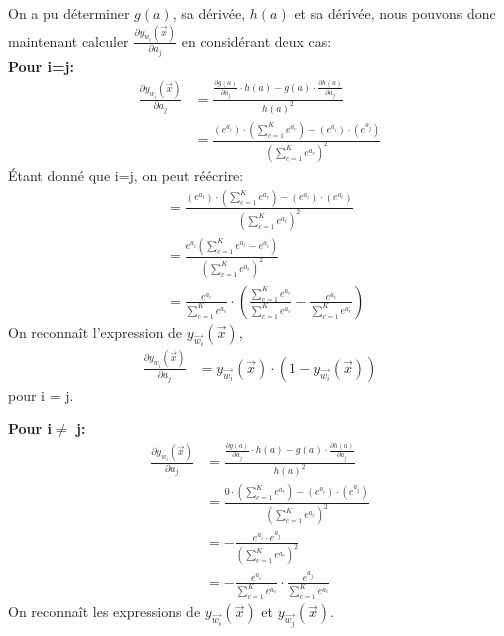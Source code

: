 On a pu déterminer $g(a)$, sa dérivée, $h(a)$ et sa dérivée, nous pouvons donc maintenant calculer $\frac{\partial y_{w_i}(\overrightarrow{x})} {\partial a_j}$ en considérant deux cas:\\
\textbf{Pour i=j:}
\begin{equation}
\begin{split}
	\frac{\partial y_{w_i}(\overrightarrow{x})} {\partial a_j} &= \frac{\frac{\partial g(a)} {\partial a_j} \cdot h(a) - g(a) \cdot \frac{\partial h(a)} {\partial a_j}}{h(a)^2} \\
	&= \frac{(e^{a_i})\cdot(\sum_{c=1}^K e^{a_c}) - (e^{a_i}) \cdot (e^{a_j})}{(\sum_{c=1}^K e^{a_c})^2}
\end{split}
\end{equation}
Étant donné que i=j, on peut réécrire:
\begin{equation}
\begin{split}
&= \frac{(e^{a_i})\cdot(\sum_{c=1}^K e^{a_c}) - (e^{a_i}) \cdot (e^{a_i})}{(\sum_{c=1}^K e^{a_c})^2} \\
&= \frac{e^{a_i}\left( \sum_{c=1}^K e^{a_c} - e^{a_i} \right)}{(\sum_{c=1}^K e^{a_c})^2} \\
&= \frac{e^{a_i}}{\sum_{c=1}^K e^{a_c}} \cdot \left(  \frac{\sum_{c=1}^K e^{a_c}}{\sum_{c=1}^K e^{a_c}} - \frac{e^{a_i}}{\sum_{c=1}^K e^{a_c}}\right)
\end{split}
\end{equation}
On reconnaît l'expression de $ y_{\overrightarrow{w_i}}(\overrightarrow{x}) $, 
\begin{equation}
\begin{split}
\frac{\partial y_{w_i}(\overrightarrow{x})} {\partial a_j} &=  y_{\overrightarrow{w_i}}(\overrightarrow{x}) \cdot \left(1-y_{\overrightarrow{w_i}}(\overrightarrow{x}) \right)
\end{split}
\end{equation}
pour i = j.

\textbf{Pour i$\neq$ j:}
\begin{equation}
\begin{split}
\frac{\partial y_{w_i}(\overrightarrow{x})} {\partial a_j} &= \frac{\frac{\partial g(a)} {\partial a_j} \cdot h(a) - g(a) \cdot \frac{\partial h(a)} {\partial a_j}}{h(a)^2} \\
&= \frac{0 \cdot (\sum_{c=1}^K e^{a_c}) - (e^{a_i}) \cdot (e^{a_j})}{(\sum_{c=1}^K e^{a_c})^2} \\
&= - \frac{e^{a_i}\cdot e^{a_j}}{(\sum_{c=1}^K e^{a_c})^2} \\
&= - \frac{e^{a_i}}{\sum_{c=1}^K e^{a_c}} \cdot \frac{e^{a_j}}{\sum_{c=1}^K e^{a_c}}
\end{split}
\end{equation}
On reconnaît les expressions de  $ y_{\overrightarrow{w_i}}(\overrightarrow{x}) $ et $ y_{\overrightarrow{w_j}}(\overrightarrow{x}) $.

